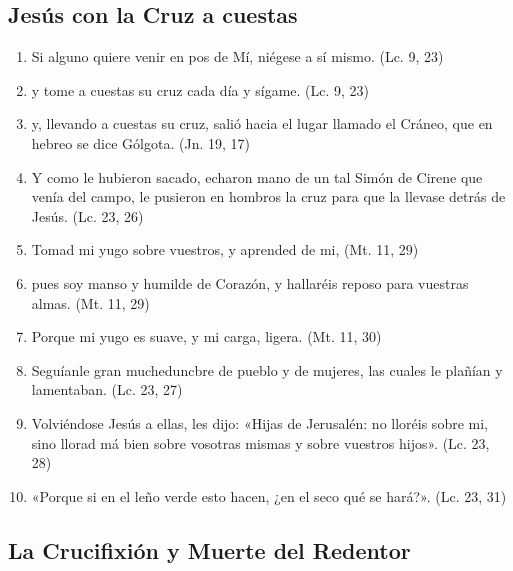 \documentclass[a4paper,11pt]{article}
\begin{document}
    \subsection*{\hfil Jesús con la Cruz a cuestas \hfil}
      
      \begin{enumerate}
        
        \item Si alguno quiere venir en pos de Mí, niégese a sí mismo. (Lc. 9, 23)

        \item y tome a cuestas su cruz cada día y sígame. (Lc. 9, 23)

        \item y, llevando a cuestas su cruz, salió hacia el lugar llamado el Cráneo, que en hebreo se dice Gólgota. (Jn. 19, 17)

        \item Y como le hubieron sacado, echaron mano de un tal Simón de Cirene que venía del campo, le pusieron en hombros la cruz para que la llevase
        detrás de Jesús. (Lc. 23, 26)

        \item Tomad mi yugo sobre vuestros, y aprended de mi, (Mt. 11, 29)

        \item pues soy manso y humilde de Corazón, y hallaréis reposo para vuestras almas. (Mt. 11, 29)

        \item Porque mi yugo es suave, y mi carga, ligera. (Mt. 11, 30)

        \item Seguíanle gran mucheduncbre de pueblo y de mujeres, las cuales le plañían y lamentaban. (Lc. 23, 27)

        \item Volviéndose Jesús a ellas, les dijo: «Hijas de Jerusalén: no lloréis sobre mi, sino llorad má bien sobre vosotras mismas y sobre
        vuestros hijos». (Lc. 23, 28)

        \item «Porque si en el leño verde esto hacen, ¿en el seco qué se hará?». (Lc. 23, 31)

      \end{enumerate}

    \subsection*{\hfil La Crucifixión y Muerte del Redentor \hfil}
      
\end{document}
